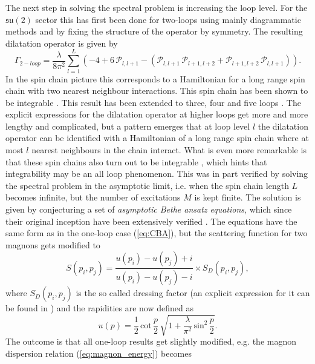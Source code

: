 The next step in solving the spectral problem is increasing the loop level. For the $\mathfrak{su}(2)$ sector this has first been done for two-loops using mainly diagrammatic methods and by fixing the structure of the operator by symmetry. The resulting dilatation operator is given by \cite{su2_loops}
\begin{equation}
	\Gamma_{2-loop} = \frac{\lambda}{8\pi^2}\sum_{l=1}^L \left(-4 + 6 \, \mathcal{P}_{l,l+1} - \left( \mathcal{P}_{l,l+1} \, \mathcal{P}_{l+1,l+2} + \mathcal{P}_{l+1,l+2} \, \mathcal{P}_{l,l+1} \right) \right).
\end{equation}
In the spin chain picture this corresponds to a Hamiltonian for a long range spin chain with two nearest neighbour interactions. This spin chain has been shown to be integrable \cite{su2_loops}. This result has been extended to three, four and five loops \cite{beisert_all_loops}. The explicit expressions for the dilatation operator at higher loops get more and more lengthy and complicated, but a pattern emerges that at loop level $l$ the dilatation operator can be identified with a Hamiltonian of a long range spin chain where at most $l$ nearest neighbours in the chain interact. What is even more remarkable is that these spin chains also turn out to be integrable \cite{three_loops}, which hints that integrability may be an all loop phenomenon. This was in part verified by solving the spectral problem in the asymptotic limit, i.e. when the spin chain length $L$ becomes infinite, but the number of excitations $M$ is kept finite. The solution is given by conjecturing a set of \emph{asymptotic Bethe ansatz equations}, which since their original inception have been extensively verified \cite{aba_tests,aba_tests2}. The equations have the same form as in the one-loop case (\ref{eq:CBA}), but the scattering function for two magnons gets modified to \cite{dorey}
\begin{equation}
	S(p_i, p_j) = \frac{u(p_i) - u(p_j) + i}{u(p_i) - u(p_j) - i} \times S_D(p_i, p_j),
\end{equation}
where $S_D(p_i, p_j)$ is the so called dressing factor (an explicit expression for it can be found in \cite{dressing}) and the rapidities are now defined as
\begin{equation}
	u(p) = \frac{1}{2} \, \mathrm{cot} \, \frac{p}{2} \, \sqrt{1 + \frac{\lambda}{\pi^2} \, \mathrm{sin}^2 \, \frac{p}{2}}.
\end{equation}
The outcome is that all one-loop results get slightly modified, e.g. the magnon dispersion relation (\ref{eq:magnon_energy}) becomes
